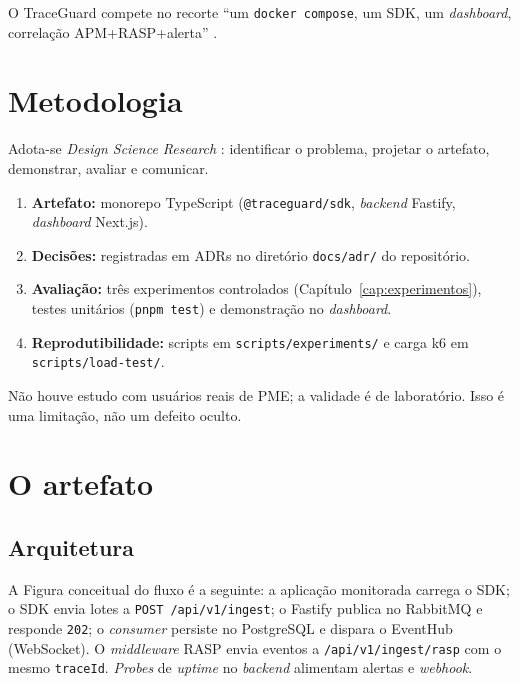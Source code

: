 \documentclass[
  12pt,
  oneside,
  a4paper,
  english,
  brazil,
  sumario=tradicional
]{abntex2}
\begin{document}
O TraceGuard compete no recorte ``um \texttt{docker compose}, um SDK, um \textit{dashboard}, correlação APM+RASP+alerta'' \cite{signoz2026,jaeger2026}.

\chapter{Metodologia}

Adota-se \textit{Design Science Research} \cite{peffers2007dsr}: identificar o problema, projetar o artefato, demonstrar, avaliar e comunicar.

\begin{enumerate}
  \item \textbf{Artefato:} monorepo TypeScript (\texttt{@traceguard/sdk}, \textit{backend} Fastify, \textit{dashboard} Next.js).
  \item \textbf{Decisões:} registradas em ADRs no diretório \texttt{docs/adr/} do repositório.
  \item \textbf{Avaliação:} três experimentos controlados (Capítulo~\ref{cap:experimentos}), testes unitários (\texttt{pnpm test}) e demonstração no \textit{dashboard}.
  \item \textbf{Reprodutibilidade:} scripts em \texttt{scripts/experiments/} e carga k6 em \texttt{scripts/load-test/}.
\end{enumerate}

Não houve estudo com usuários reais de PME; a validade é de laboratório. Isso é uma limitação, não um defeito oculto.

\chapter{O artefato}

\section{Arquitetura}

A Figura conceitual do fluxo é a seguinte: a aplicação monitorada carrega o SDK; o SDK envia lotes a \texttt{POST /api/v1/ingest}; o Fastify publica no RabbitMQ e responde \texttt{202}; o \textit{consumer} persiste no PostgreSQL e dispara o EventHub (WebSocket). O \textit{middleware} RASP envia eventos a \texttt{/api/v1/ingest/rasp} com o mesmo \texttt{traceId}. \textit{Probes} de \textit{uptime} no \textit{backend} alimentam alertas e \textit{webhook}.
\end{document}
